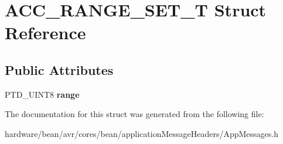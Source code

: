 \hypertarget{struct_a_c_c___r_a_n_g_e___s_e_t___t}{}\section{A\+C\+C\+\_\+\+R\+A\+N\+G\+E\+\_\+\+S\+E\+T\+\_\+\+T Struct Reference}
\label{struct_a_c_c___r_a_n_g_e___s_e_t___t}
\subsection*{Public Attributes}
\begin{DoxyCompactItemize}
\item 
\hypertarget{struct_a_c_c___r_a_n_g_e___s_e_t___t_a25ad520026f90860ce7d04f30145c742}{}P\+T\+D\+\_\+\+U\+I\+N\+T8 {\bfseries range}\label{struct_a_c_c___r_a_n_g_e___s_e_t___t_a25ad520026f90860ce7d04f30145c742}

\end{DoxyCompactItemize}


The documentation for this struct was generated from the following file\+:\begin{DoxyCompactItemize}
\item 
hardware/bean/avr/cores/bean/application\+Message\+Headers/App\+Messages.\+h\end{DoxyCompactItemize}
